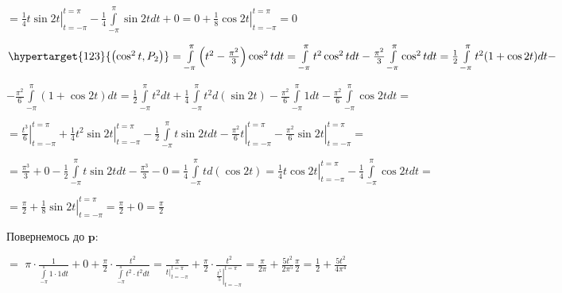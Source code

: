 \documentclass[a5paper, 20pt, titlepage]{article}
\newcommand{\p}{\textbf{p}}
\newcommand{\Int}[1]{\int \limits_{-\pi}^{\pi} #1 dt}
\begin{document}
\vspace{4mm}
\hspace{21mm}
$=  \left. \frac{1}{4} t \sin 2t \right|_{t = -\pi}^{t = \pi} - \frac{1}{4} \Int{\sin 2t} + 0 = 0 + \left. \frac{1}{8} \cos 2t \right|_{t = -\pi}^{t = \pi} = 0$

\vspace{3mm}
\hspace{4mm}
$\hypertarget{123}{\left(\cos^2  t, P_2 \right)} = \Int{\left(t^2 - \frac{\pi^2}{3} \right) \cos^2 t} = \Int{t^2 \cos^2 t} - \frac{\pi^2}{3} \Int{\cos^2 t} =
\frac{1}{2} \Int{t^2(1 + \cos 2t)} -
$ 

\vspace{3mm}
\hspace{21mm}
$-\frac{\pi^2}{6} \Int{(1 + \cos 2t)} = \frac{1}{2} \Int{t^2} + \frac{1}{4} \int \limits_{-\pi}^{\pi} t^2 d(\sin 2t) - \frac{\pi^2}{6} \Int{1} - \frac{\pi^2}{6} \Int{\cos 2t} = $

\vspace{3mm}
\hspace{21mm}
$= \left. \frac{t^3}{6} \right|_{t = - \pi}^{t = \pi} + \left. \frac{1}{4} t^2 \sin 2t  \right|_{t = - \pi}^{t = \pi} - \frac{1}{2} \Int{t \sin 2t} - \left. \frac{\pi^2}{6} t \right|_{t = - \pi}^{t = \pi} - 
\left. \frac{\pi^2}{6} \sin 2t \right|_{t = - \pi}^{t = \pi} = $

\vspace{3mm}
\hspace{21mm}
$= \frac{\pi^3}{3} + 0 - \frac{1}{2} \Int{t \sin 2t} - \frac{\pi^3}{3} - 0 = \frac{1}{4} \int \limits_{-\pi}^{\pi} t d(\cos 2t) = \left. \frac{1}{4} t \cos 2t \right|_{t = - \pi}^{t = \pi} - \frac{1}{4} \Int{\cos 2t} = $

\vspace{3mm}
\hspace{21mm}
$= \frac{\pi}{2} + \left. \frac{1}{8} \sin 2t \right|_{t = -\pi}^{t = \pi} = \frac{\pi}{2} + 0 = \frac{\pi}{2}$

\vspace{4mm}
Повернемось до $\p$:

\vspace{3mm}
\hspace{7mm}
$\boxed{=} \,\, \pi \cdot \frac{1}{\Int{1 \cdot 1}} + 0 + \frac{\pi}{2} \cdot \frac{t^2}{\Int{t^2 \cdot t^2}} =
\frac{\pi}{\left. t \right|_{t = -\pi}^{t = \pi}} + \frac{\pi}{2}  \cdot \frac{t^2}{\left. \frac{t^5}{5} \right|_{t = -\pi}^{t = \pi}} =
\frac{\pi}{2 \pi} + \frac{5 t^2}{2 \pi^5} \frac{\pi}{2} = \frac{1}{2} + \frac{5 t^2}{4\pi^4}$
\end{document}
